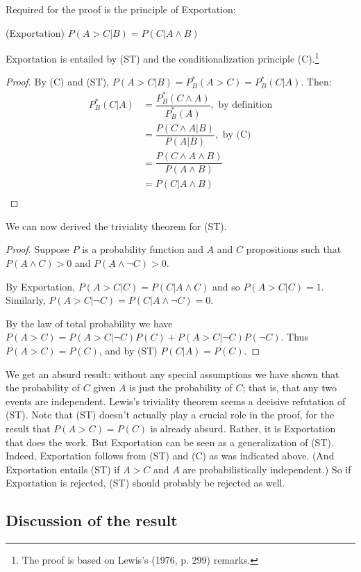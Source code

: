 \documentclass[12pt]{article}
\begin{document}
Required for the proof is the principle of Exportation:

(Exportation) $P(A>C|B)=P(C|A\land B)$

Exportation is entailed by (ST) and the conditionalization principle (C).\footnote{The proof is based on Lewis's (1976, p. 299) remarks.}

\begin{proof}
By (C) and (ST), $P(A>C|B)=P_B^*(A>C)=P_B^*(C|A)$.
Then:
\begin{equation*}
\begin{split}
    P_B^*(C|A) &= \dfrac{P_B^*(C \land A)}{P_B^*(A)}, \text{ by definition} \\
    &= \dfrac{P(C \land A|B)}{P(A|B)}, \text{ by (C)} \\
    &= \dfrac{P(C \land A \land B)}{P(A\land B)} \\
    &= P(C|A\land B) \\
\end{split}
\end{equation*}
\end{proof}

We can now derived the triviality theorem for (ST).

\begin{proof}
Suppose $P$ is a probability function and $A$ and $C$ propositions such that $P(A\land C)>0$ and $P(A\land \neg C)>0$.

By Exportation, $P(A>C|C)=P(C|A\land C)$ and so $P(A>C|C)=1$. Similarly, $P(A>C|\neg C)=P(C|A\land \neg C)=0$.

By the law of total probability we have $P(A>C)=P(A>C|\neg C)P(C) + P(A>C|\neg C)P(\neg C)$. Thus $P(A>C)=P(C)$, and by (ST) $P(C|A)=P(C)$.
\end{proof}

We get an absurd result: without any special assumptions we have shown that the probability of $C$ given $A$ is just the probability of $C$; that is, that any two events are independent. Lewis's triviality theorem seems a decisive refutation of (ST). Note that (ST) doesn't actually play a crucial role in the proof, for the result that $P(A>C)=P(C)$ is already absurd. Rather, it is Exportation that does the work. But Exportation can be seen as a generalization of (ST). Indeed, Exportation follows from (ST) and (C) as was indicated above. (And Exportation entails (ST) if $A>C$ and $A$ are probabilistically independent.) So if Exportation is rejected, (ST) should probably be rejected as well.

\subsection{Discussion of the result}
\end{document}
